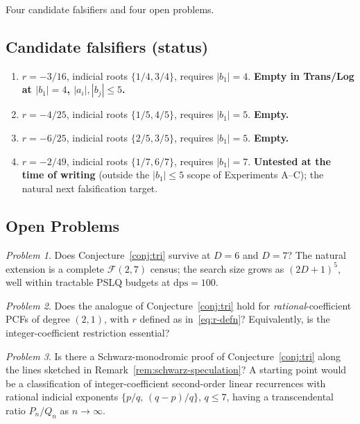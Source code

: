 \documentclass[11pt]{amsart}
\theoremstyle{definition}
\theoremstyle{remark}
\newtheorem{problem}{Problem}
\newcommand{\FF}{\mathcal{F}}
\newcommand{\dps}{\mathrm{dps}}
\begin{document}
Four candidate falsifiers and four open problems.

\subsection*{Candidate falsifiers (status)}
\begin{enumerate}[label={\upshape(\arabic*)}]
\item $r = -3/16$, indicial roots $\{1/4, 3/4\}$, requires $|b_1| = 4$.
\textbf{Empty in Trans/Log at $|b_1| = 4$, $|a_i|, |b_j| \le 5$.}
\item $r = -4/25$, indicial roots $\{1/5, 4/5\}$, requires
$|b_1| = 5$. \textbf{Empty.}
\item $r = -6/25$, indicial roots $\{2/5, 3/5\}$, requires
$|b_1| = 5$. \textbf{Empty.}
\item $r = -2/49$, indicial roots $\{1/7, 6/7\}$, requires
$|b_1| = 7$.  \textbf{Untested at the time of writing} (outside the
$|b_1| \le 5$ scope of Experiments A--C); the natural next
falsification target.
\end{enumerate}

\subsection*{Open Problems}
\begin{problem}\label{prob:d6}
Does Conjecture~\ref{conj:tri} survive at $D = 6$ and $D = 7$?
The natural extension is a complete $\FF(2,7)$ census; the search
size grows as $(2D{+}1)^5$, well within tractable PSLQ budgets at
$\dps = 100$.
\end{problem}

\begin{problem}\label{prob:rational-coeffs}
Does the analogue of Conjecture~\ref{conj:tri} hold for
\emph{rational}-coefficient PCFs of degree $(2,1)$, with $r$ defined
as in~\eqref{eq:r-defn}?  Equivalently, is the integer-coefficient
restriction essential?
\end{problem}

\begin{problem}\label{prob:schwarz}
Is there a Schwarz-monodromic proof of Conjecture~\ref{conj:tri}
along the lines sketched in Remark~\ref{rem:schwarz-speculation}?
A starting point would be a classification of integer-coefficient
second-order linear recurrences with rational indicial exponents
$\{p/q,\,(q-p)/q\}$, $q \le 7$, having a transcendental ratio
$P_n/Q_n$ as $n \to \infty$.
\end{problem}
\end{document}
